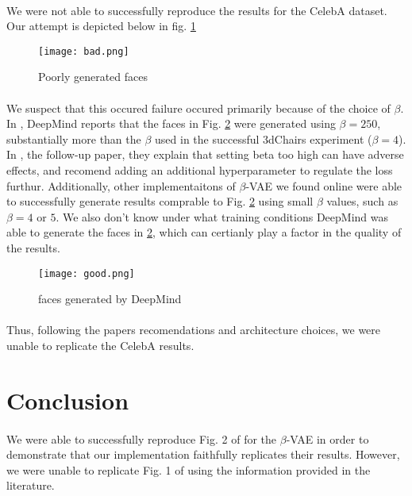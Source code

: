 \documentclass[justified,nobib]{tufte-handout}
\begin{document}
\begin{fullwidth}
\paragraph{} We were not able to successfully reproduce the results for the CelebA dataset. Our attempt is depicted below in fig. \ref{bad}
\begin{figure}
\centering
\label{bad}
\texttt{[image: bad.png]}
\caption{Poorly generated faces} 
\end{figure}
\paragraph{} We suspect that this occured failure occured primarily because of the choice of $\beta$. In \cite{bvae}, DeepMind reports that the faces in Fig. \ref{good} were generated using $\beta = 250$, substantially more than the $\beta$ used in the successful 3dChairs experiment ($\beta=4$). In \cite{bvae-dis}, the follow-up paper, they explain that setting beta too high can have adverse effects, and recomend adding an additional hyperparameter to regulate the loss furthur. Additionally, other implementaitons of $\beta$-VAE we found online were able to successfully generate results comprable to Fig. \ref{good} using small $\beta$ values, such as $\beta=4$ or $5$. We also don't know under what training conditions DeepMind was able to generate the faces in \ref{good}, which can certianly play a factor in the quality of the results. 
\begin{figure}
\centering
\label{good}
\texttt{[image: good.png]}
\caption{faces generated by DeepMind} 
\end{figure}
\paragraph{} Thus, following the papers recomendations and architecture choices, we were unable to replicate the CelebA results. 
\clearpage
\section{Conclusion}
\paragraph{} We were able to successfully reproduce Fig. 2 of \citep{bvae} for the $\beta$-VAE in order to demonstrate that our implementation faithfully replicates their results. However, we were unable to replicate Fig. 1 of \citep{bvae} using the information provided in the literature. 
{}


\end{fullwidth}
\end{document}
